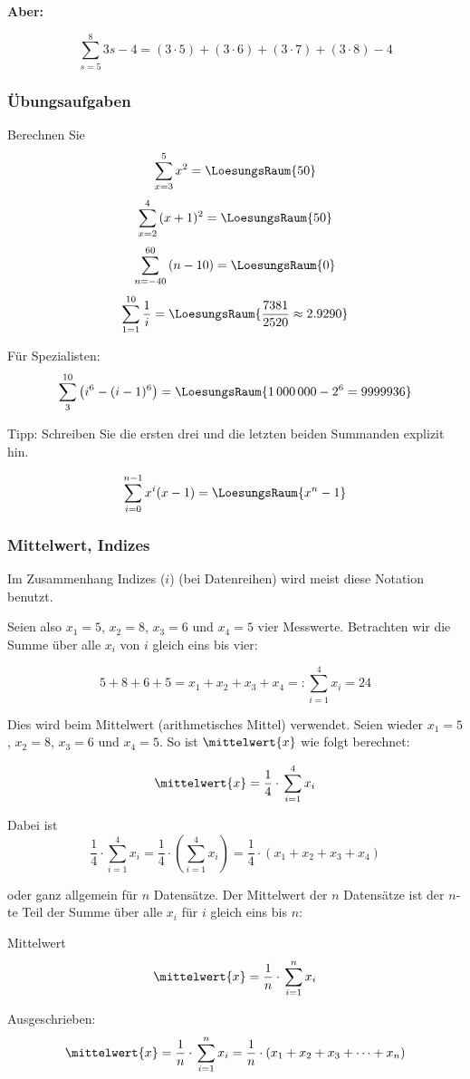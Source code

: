 \textbf{Aber:}

\begin{beispiel}{}{}
  $$\sum_{s=5}^{8}{3s-4} = (3\cdot 5) + (3\cdot 6) + (3\cdot 7) + (3\cdot 8) - 4$$  
\end{beispiel}


\subsubsection{Übungsaufgaben}
Berechnen Sie
$$\sum_{x=3}^5{x^2} = \LoesungsRaum{50}$$
$$\sum_{x=2}^4{(x+1)^2} = \LoesungsRaum{50}$$
$$\sum_{n=-40}^{60}{(n-10)} = \LoesungsRaum{0}$$
$$\sum_{1=1}^{10}{\frac{1}{i}} = \LoesungsRaum{\frac{7381}{2520}
  \approx 2.9290}$$

Für Spezialisten:
$$\sum_{3}^{10}\left(i^6 - ( i-1 )^6\right) = \LoesungsRaum{1\,000\,000 - 2^6 = 9999936}$$

Tipp: Schreiben Sie die ersten drei und die letzten beiden Summanden
explizit hin.

$$\sum_{i=0}^{n-1}x^i(x-1)=\LoesungsRaum{x^n-1}$$
\newpage



\subsubsection{Mittelwert, Indizes}
Im Zusammenhang Indizes ($i$) (\zB bei Datenreihen) wird meist diese
Notation benutzt.

Seien also $x_1=5$, $x_2=8$, $x_3=6$ und $x_4=5$ vier
Messwerte. Betrachten wir die Summe über
alle $x_i$ von $i$ gleich eins bis vier:

$$5+8+6+5 = x_1 + x_2 + x_3 + x_4 =: \sum_{i=1}^4{x_i}=24$$


Dies wird \zB beim Mittelwert (arithmetisches Mittel)
verwendet. Seien wieder $x_1=5$, $x_2=8$, $x_3=6$ und $x_4=5$. So ist
$\mittelwert{x}$ wie folgt berechnet:

$$\mittelwert{x} = \frac{1}{4}\cdot{}\sum_{i=1}^{4}{x_i}$$

Dabei ist $$\frac{1}{4}\cdot{}\sum_{i=1}^{4}{x_i}=\frac{1}{4}\cdot{}\left( \sum_{i=1}^{4}{x_i}\right) =\frac{1}{4}\cdot{}(x_1 + x_2 + x_3 + x_4)$$

oder ganz allgemein für $n$ Datensätze. Der Mittelwert der $n$
Datensätze ist der $n$-te Teil der Summe über alle $x_i$ für $i$
gleich eins bis $n$:

\begin{gesetz}{Mittelwert}{}
$$\mittelwert{x} = \frac{1}{n}\cdot{}\sum_{i=1}^{n}{x_i}$$
\end{gesetz}

Ausgeschrieben:
$$\mittelwert{x} = \frac{1}{n}\cdot{}\sum_{i=1}^{n}{x_i} = \frac{1}{n}\cdot{}(x_1 + x_2 + x_3 + \dots + x_n)$$

\newpage
